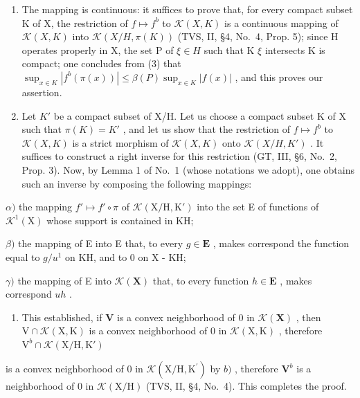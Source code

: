 \begin{enumerate}
\def\labelenumi{\alph{enumi})}
\item
  The mapping is continuous: it suffices to prove that, for every compact subset K of X, the restriction of \(f \mapsto f^{b}\) to \(\mathcal{K}(X, K)\) is a continuous mapping of \(\mathcal{K}(X, K)\) into \(\mathcal{K}(X / H, \pi(K))\) (TVS, II, §4, No.~4, Prop. 5); since H operates properly in X, the set P of \(\xi \in H\) such that K \(\xi\) intersects K is compact; one concludes from (3) that \(\sup_{x \in K} |f^{b}(\pi(x))| \leqslant \beta(P) \sup_{x \in K} |f(x)|\) , and this proves our assertion.
\item
  Let \(K'\) be a compact subset of X/H. Let us choose a compact subset K of X such that \(\pi(K) = K'\) , and let us show that the restriction of \(f \mapsto f^{b}\) to \(\mathcal{K}(X, K)\) is a strict morphism of \(\mathcal{K}(X, K)\) onto \(\mathcal{K}(X/H, K')\) . It suffices to construct a right inverse for this restriction (GT, III, §6, No.~2, Prop. 3). Now, by Lemma 1 of No.~1 (whose notations we adopt), one obtains such an inverse by composing the following mappings:
\end{enumerate}

\(\alpha)\) the mapping \(f' \mapsto f' \circ \pi\) of \(\mathcal{K}(\mathrm{X}/\mathrm{H}, \mathrm{K}')\) into the set E of functions of \(\mathcal{K}^1(\mathrm{X})\) whose support is contained in KH;

\(\beta)\) the mapping of E into E that, to every \(g \in \mathbf{E}\) , makes correspond the function equal to \(g / u^1\) on KH, and to 0 on X - KH;

\(\gamma)\) the mapping of E into \(\mathcal{K}(\mathbf{X})\) that, to every function \(h \in \mathbf{E}\) , makes correspond \(uh\) .

\begin{enumerate}
\def\labelenumi{\alph{enumi})}
\setcounter{enumi}{2}
\tightlist
\item
  This established, if \(\mathbf{V}\) is a convex neighborhood of 0 in \(\mathcal{K}(\mathbf{X})\) , then \(\mathrm{V} \cap \mathcal{K}(\mathrm{X}, \mathrm{K})\) is a convex neighborhood of 0 in \(\mathcal{K}(\mathrm{X}, \mathrm{K})\) , therefore \(\mathrm{V}^{b} \cap \mathcal{K}(\mathrm{X} / \mathrm{H}, \mathrm{K}')\)
\end{enumerate}

is a convex neighborhood of 0 in \(\mathcal{K}(\mathrm{X / H},\mathrm{K}^{\prime})\) by \(b)\) , therefore \(\mathbf{V}^b\) is a neighborhood of 0 in \(\mathcal{K}(\mathrm{X / H})\) (TVS, II, §4, No.~4). This completes the proof.

